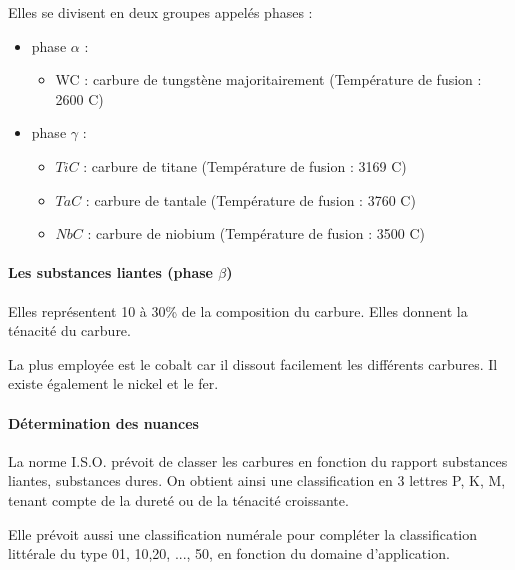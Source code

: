 \documentclass[11pt,oneside]{article}
\begin{document}
Elles se divisent en deux groupes appelés phases :
\begin{itemize}
\item phase $\alpha$ :
\begin{itemize}
\item WC : carbure de tungstène majoritairement (Température de fusion : 2600 \degre C)
\end{itemize}
\item phase $\gamma$ :
\begin{itemize}
\item $TiC$ : carbure de titane (Température de fusion : 3169 \degre C)
\item $TaC$ : carbure de tantale (Température de fusion : 3760 \degre C)
\item $NbC$ : carbure de niobium (Température de fusion : 3500 \degre C)
\end{itemize}
\end{itemize}


\paragraph{Les substances liantes (phase $\beta$)}

Elles représentent 10 à 30\% de la composition du carbure. Elles donnent la ténacité du carbure.
	
La plus employée est le cobalt car il dissout facilement les différents carbures. Il existe également le nickel et le fer.



\paragraph{Détermination des nuances}
La norme I.S.O. prévoit de classer les carbures en fonction du rapport substances liantes, substances dures. On obtient ainsi une classification en 3 lettres P, K, M, tenant compte de la dureté ou de la ténacité croissante.

Elle prévoit aussi une classification numérale pour compléter la classification littérale du type 01, 10,20, ..., 50, en fonction du domaine d'application.
 
\end{document}

